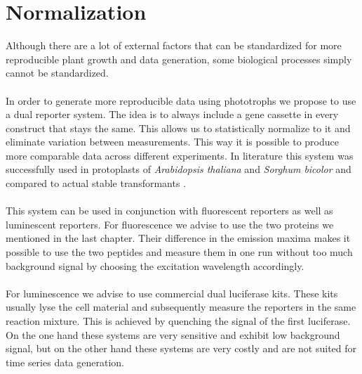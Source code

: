 \section{Normalization}
Although there are a lot of external factors that can be standardized for more reproducible plant growth and data generation, some biological processes simply cannot be standardized.
\\ \\
In order to generate more reproducible data using phototrophs we propose to use a dual reporter system. The idea is to always include a gene cassette in every construct  that stays the same. This allows us to statistically normalize to it and eliminate variation between measurements. This way it is possible to produce more comparable data across different experiments. In literature this system was successfully used in protoplasts of \textit{Arabidopsis thaliana} and \textit{Sorghum bicolor} and compared to actual stable transformants \parencite{Schaumberg2015}.
\\ \\
This system can be used in conjunction with fluorescent reporters as well as luminescent reporters. For fluorescence we advise to use the two proteins we mentioned in the last chapter. Their difference in the emission maxima makes it possible to use the two peptides and measure them in one run without too much background signal by choosing the excitation wavelength accordingly.
\\ \\
For luminescence we advise to use commercial dual luciferase kits. These kits usually lyse the cell material and subsequently measure the reporters in the same reaction mixture. This is achieved by quenching the signal of the first luciferase. On the one hand these systems are very sensitive and exhibit low background signal, but on the other hand these systems are very costly and are not suited for time series data generation.

